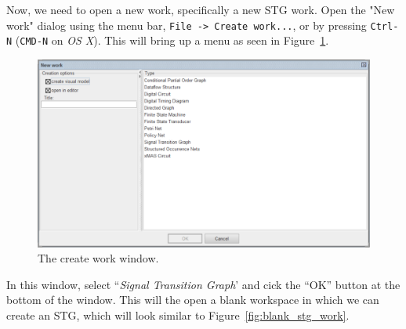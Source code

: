 \documentclass[british,technote,compsoc]{IEEEtran}
\begin{document}
Now, we need to open a new work, specifically a new STG work. Open the "New work" dialog using the menu bar, \texttt{File -> Create work...}, or by pressing \texttt{Ctrl-N} 
(\texttt{CMD-N} on \emph{OS X}). This will bring up a menu as seen in Figure~\ref{fig:new_work_screen}.

\begin{figure}[H]
\begin{centering}
\includegraphics[scale=0.4]{images/new_work_screenshot}
\par\end{centering}

\begin{centering}
\protect\caption{\label{fig:new_work_screen}The create work window.}

\par\end{centering}

\end{figure}

In this window, select ``\emph{Signal Transition Graph}' and cick the ``OK'' button at the bottom of the window. 
This will the open a blank workspace in which we can create an STG, which 
will look similar to Figure~\ref{fig:blank_stg_work}.
\end{document}
